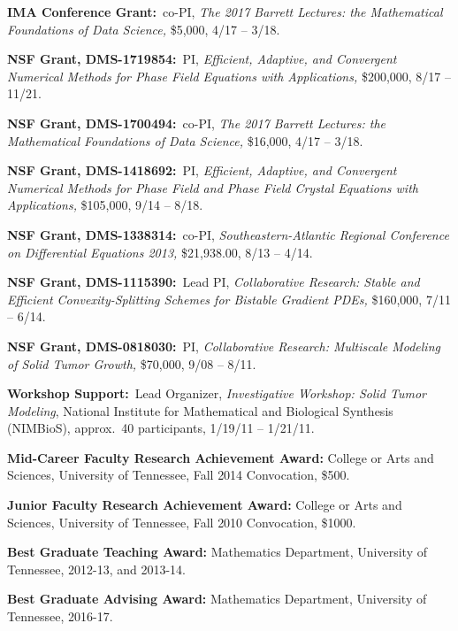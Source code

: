 \documentclass[11pt]{letter}
\begin{document}
\begin{description}
    \item
\textbf{IMA Conference Grant:}~co-PI, {\sl The 2017 Barrett Lectures: the Mathematical Foundations of Data Science,} \$5,000, 4/17 -- 3/18.


    \item
\textbf{NSF Grant, DMS-1719854:}~PI, {\sl Efficient, Adaptive, and Convergent Numerical Methods for Phase Field Equations with Applications,} \$200,000, 8/17 -- 11/21.


	 \item
\textbf{NSF Grant, DMS-1700494:}~co-PI, {\sl The 2017 Barrett Lectures: the Mathematical Foundations of Data Science,} \$16,000, 4/17 -- 3/18.

    \item
\textbf{NSF Grant, DMS-1418692:}~PI, {\sl Efficient, Adaptive, and Convergent Numerical Methods for Phase Field and Phase Field Crystal Equations with Applications,} \$105,000, 9/14 -- 8/18.

    \item
\textbf{NSF Grant, DMS-1338314:}~co-PI, {\sl Southeastern-Atlantic Regional Conference on Differential Equations 2013,} \$21,938.00, 8/13 -- 4/14.

    \item
\textbf{NSF Grant, DMS-1115390:}~Lead PI, {\sl Collaborative Research: Stable and Efficient Convexity-Splitting Schemes for Bistable Gradient PDEs,} \$160,000, 7/11 -- 6/14.

    \item
\textbf{NSF Grant, DMS-0818030:}~PI, {\sl Collaborative Research: Multiscale Modeling of Solid Tumor Growth,} \$70,000, 9/08 -- 8/11.
	
	\item
\textbf{Workshop Support:}~Lead Organizer, {\sl Investigative Workshop: Solid Tumor Modeling}, National Institute for Mathematical and Biological Synthesis (NIMBioS), approx.~40 participants, 1/19/11 -- 1/21/11.
	
	\item
\textbf{Mid-Career Faculty Research Achievement Award:} College or Arts and Sciences, University of Tennessee, Fall 2014 Convocation, \$500.
	\item
\textbf{Junior Faculty Research Achievement Award:} College or Arts and Sciences, University of Tennessee, Fall 2010 Convocation, \$1000.
	\item
\textbf{Best Graduate Teaching Award:} Mathematics Department, University of Tennessee, 2012-13, and 2013-14.
	\item
\textbf{Best Graduate Advising Award:} Mathematics Department, University of Tennessee, 2016-17.

    \end{description}
	
\end{document}
